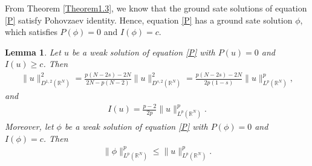 \documentclass[12pt,a4paper,reqno]{amsart}
\numberwithin{equation}{section}
\newtheorem{lemma}{Lemma}[section]
\begin{document}
From Theorem \ref{Theorem1.3},
we know that the ground sate solutions of equation \eqref{P} satisfy Pohov{z}aev identity.
Hence, equation \eqref{P} has a ground sate solution $\phi$, which satisfies $P(\phi)=0$ and $I(\phi)=c$.
\begin{lemma}\label{Lemma6.1}
Let $u$ be a weak solution of equation \eqref{P} with $P(u)=0$ and $I(u)\geqslant c$.
Then
\begin{equation}\label{6.1}
\begin{aligned}
\|u\|_{D^{1,2}(\mathbb{R}^{N})}^{2}
=
\frac{p(N-2s)-2N}{2N-p(N-2)}
\|u\|_{D^{s,2}(\mathbb{R}^{N})}^{2}
=
\frac{p(N-2s)-2N}{2p(1-s)}
\|u\|_{L^{p}(\mathbb{R}^{N})}^{p},
\end{aligned}
\end{equation}
and
\begin{equation*}
\begin{aligned}
I(u)=\frac{p-2}{2p}
\|u\|_{L^{p}(\mathbb{R}^{N})}^{p}.
\end{aligned}
\end{equation*}
Moreover, let $\phi$ be a weak solution of equation \eqref{P} with $P(\phi)=0$ and $I(\phi)=c$. Then
\begin{equation*}
\begin{aligned}
\|\phi\|_{L^{p}(\mathbb{R}^{N})}^{p}
\leqslant
\|u\|_{L^{p}(\mathbb{R}^{N})}^{p}.
\end{aligned}
\end{equation*}
\end{lemma}
\end{document}
